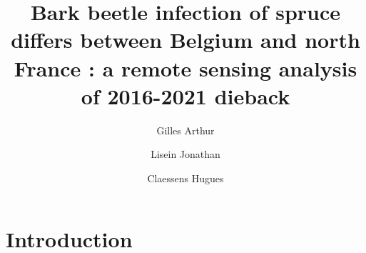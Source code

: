 \documentclass[3p,times]{elsarticle}
\begin{document}
\begin{frontmatter}


\author[label2]{Gilles Arthur}
\author[label2]{Lisein Jonathan}
\author[label2]{Claessens Hugues}




\title{Bark beetle infection of spruce differs between Belgium and north France : a remote sensing analysis of 2016-2021 dieback}

\begin{abstract}

\end{abstract}

\begin{keyword}
\end{keyword}

\end{frontmatter}

\linenumbers

\pagebreak
\section{Introduction}
\end{document}
